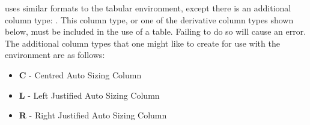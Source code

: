    uses similar formats to the tabular environment, except there is an additional column type: .
  This column type, or one of the derivative column types shown below, must be included in the use of a  table. 
  Failing to do so will cause an error. The additional column types that one might like to create for use with the  environment are as follows:
  \begin{itemize}
    \item \textbf{C} - Centred Auto Sizing Column\\
    \item \textbf{L} - Left Justified Auto Sizing Column \\
    \item \textbf{R} - Right Justified Auto Sizing Column \\
  \end{itemize}
  
